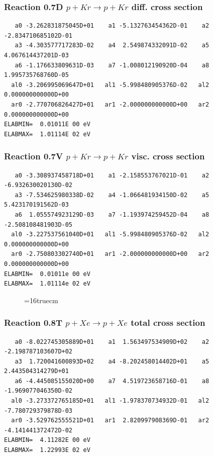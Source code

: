 \documentclass[12pt,dvips]{article}
\begin{document}
\subsubsection{
Reaction 0.7D    $p + Kr \rightarrow p + Kr  $ diff. cross
section }


\begin{small}\begin{verbatim}
   a0 -3.262831875045D+01    a1 -5.132763454362D-01    a2 -2.834710685102D-01
   a3 -4.303577717283D-02    a4  2.549874332091D-02    a5  4.067614437201D-03
   a6 -1.176633809631D-03    a7 -1.008012190920D-04    a8  1.995735768760D-05
  al0 -3.206995069647D+01   al1 -5.998480905376D-02   al2  0.000000000000D+00
  ar0 -2.770706826427D+01   ar1 -2.000000000000D+00   ar2  0.000000000000D+00
ELABMIN=  0.01011E 00 eV
ELABMAX=  1.01114E 02 eV
\end{verbatim}\end{small}

\subsubsection{
Reaction 0.7V   $ p + Kr \rightarrow p + Kr  $ visc. cross
section }


\begin{small}\begin{verbatim}
   a0 -3.308937458718D+01    a1 -2.158553767021D-01    a2 -6.932630020130D-02
   a3 -7.534625980338D-02    a4 -1.066481934150D-02    a5  5.423170191562D-03
   a6  1.055574923129D-03    a7 -1.193974259452D-04    a8 -2.508108481903D-05
  al0 -3.227537561040D+01   al1 -5.998480905376D-02   al2  0.000000000000D+00
  ar0 -2.750803302740D+01   ar1 -2.000000000000D+00   ar2  0.000000000000D+00
ELABMIN=  0.01011e 00 eV
ELABMAX=  1.01114e 02 eV
\end{verbatim}\end{small}


\begin{figure} \label{0.7}
\epsfxsize=16truecm
\end{figure}
\newpage


\subsubsection{
Reaction 0.8T   $ p + Xe \rightarrow p + Xe $ total cross
section }



\begin{small}\begin{verbatim}
   a0 -8.022745305889D+01    a1  1.563497534909D+02    a2 -2.198787103607D+02
   a3  1.720041600893D+02    a4 -8.202458014402D+01    a5  2.443504314279D+01
   a6 -4.445085155020D+00    a7  4.519723658716D-01    a8 -1.969077046350D-02
  al0 -3.273372765185D+01   al1 -1.978370734932D-01   al2 -7.780729379878D-03
  ar0 -3.529762555521D+01   ar1  2.820997908369D-01   ar2 -4.141441372472D-02
ELABMIN=  4.11282E 00 eV
ELABMAX=  1.22993E 02 eV
\end{verbatim}\end{small}
\end{document}
